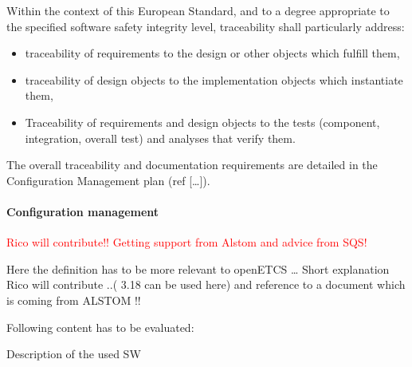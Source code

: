 \documentclass{template/openetcs_article}
\begin{document}
Within the context of this European Standard, and to a degree appropriate to the specified software safety integrity level, traceability shall particularly address:

\begin{itemize}
\item traceability of requirements to the design or other objects which fulfill them,
\item traceability of design objects to the implementation objects which instantiate them,
\item Traceability of requirements and design objects to the tests (component, integration, overall test) and analyses that verify them.
\end{itemize}
The overall traceability and documentation requirements are detailed in the Configuration Management plan (ref [{\dots}]).


\paragraph{Configuration management}
\textcolor{red}{Rico will contribute!! Getting support from Alstom and advice from SQS!}

Here the definition has to be more relevant to openETCS {\dots}
Short explanation Rico will contribute ..( 3.18 can be used here) and reference to a document which is coming from ALSTOM !!

Following content has to be evaluated:

Description of the used SW 
\end{document}
